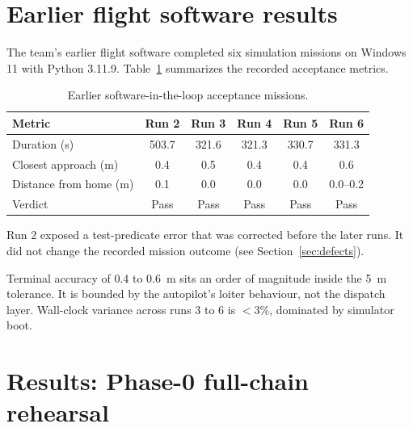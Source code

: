 \documentclass[12pt,a4paper]{report}
\begin{document}
\section{Earlier flight software results}
\label{sec:flightresults}

The team's earlier flight software completed six simulation missions
on Windows 11 with Python 3.11.9. Table~\ref{tab:runs} summarizes the
recorded acceptance metrics.

\begin{table}[htbp]
\centering
\caption{Earlier software-in-the-loop acceptance missions.}
\label{tab:runs}
\small
\begin{tabular}{|l|c|c|c|c|c|}
\hline
\textbf{Metric} & \textbf{Run 2} & \textbf{Run 3} & \textbf{Run 4} &
\textbf{Run 5} & \textbf{Run 6} \\
\hline
Duration (s) & 503.7 & 321.6 & 321.3 & 330.7 & 331.3 \\\hline
Closest approach (m) & 0.4 & 0.5 & 0.4 & 0.4 & 0.6 \\\hline
Distance from home (m) & 0.1 & 0.0 & 0.0 & 0.0 & 0.0--0.2 \\\hline
Verdict & Pass & Pass & Pass & Pass & Pass \\\hline
\end{tabular}

\end{table}

Run 2 exposed a test-predicate error that was corrected before the
later runs. It did not change the recorded mission outcome (see
Section~\ref{sec:defects}).

Terminal accuracy of 0.4 to 0.6~m sits an order of magnitude inside
the 5~m tolerance. It is bounded by the autopilot's loiter behaviour,
not the dispatch layer. Wall-clock variance across runs 3 to 6 is
$<$3\%, dominated by simulator boot.

\section{Results: Phase-0 full-chain rehearsal}
\label{sec:phase0results}
\end{document}
